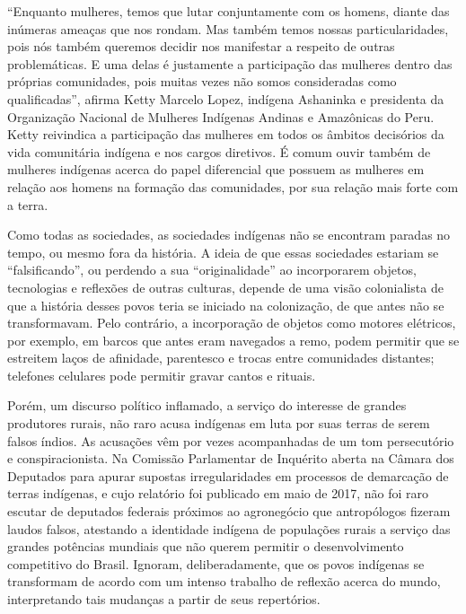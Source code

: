 ``Enquanto mulheres, temos que lutar conjuntamente com os homens, diante
das inúmeras ameaças que nos rondam. Mas também temos nossas
particularidades, pois nós também queremos decidir nos manifestar a
respeito de outras problemáticas. E uma delas é justamente a
participação das mulheres dentro das próprias comunidades, pois muitas
vezes não somos consideradas como qualificadas'', afirma Ketty Marcelo
Lopez, indígena Ashaninka e presidenta da Organização Nacional de
Mulheres Indígenas Andinas e Amazônicas do Peru. Ketty reivindica a
participação das mulheres em todos os âmbitos decisórios da vida
comunitária indígena e nos cargos diretivos. É comum ouvir também de
mulheres indígenas acerca do papel diferencial que possuem as mulheres
em relação aos homens na formação das comunidades, por sua relação mais
forte com a terra.

Como todas as sociedades, as sociedades indígenas não se encontram
paradas no tempo, ou mesmo fora da história. A ideia de que essas
sociedades estariam se ``falsificando'', ou perdendo a sua
``originalidade'' ao incorporarem objetos, tecnologias e reflexões de
outras culturas, depende de uma visão colonialista de que a história
desses povos teria se iniciado na colonização, de que antes não se
transformavam. Pelo contrário, a incorporação de objetos como motores
elétricos, por exemplo, em barcos que antes eram navegados a remo, podem
permitir que se estreitem laços de afinidade, parentesco e trocas entre
comunidades distantes; telefones celulares pode permitir gravar cantos
e rituais.

Porém, um discurso político inflamado, a serviço do interesse de grandes
produtores rurais, não raro acusa indígenas em luta por suas terras de
serem falsos índios. As acusações vêm por vezes acompanhadas de um tom
persecutório e conspiracionista. Na Comissão Parlamentar de Inquérito
aberta na Câmara dos Deputados para apurar supostas irregularidades em
processos de demarcação de terras indígenas, e cujo relatório foi
publicado em maio de 2017, não foi raro escutar de deputados federais
próximos ao agronegócio que antropólogos fizeram laudos falsos,
atestando a identidade indígena de populações rurais a serviço das
grandes potências mundiais que não querem permitir o desenvolvimento
competitivo do Brasil. Ignoram, deliberadamente, que os povos indígenas
se transformam de acordo com um intenso trabalho de reflexão acerca do
mundo, interpretando tais mudanças a partir de seus repertórios.

